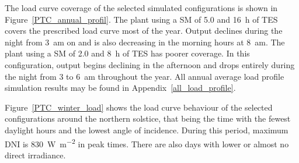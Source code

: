 The load curve coverage of the selected simulated configurations is shown in Figure~\ref{PTC_annual_profil}. The plant using a SM of \num{5.0} and \SI{16}{h} of TES covers the prescribed load curve most of the year. Output declines during the night from \SI{3}{am} on and is also decreasing in the morning hours at \SI{8}{am}. The plant using a SM of \num{2.0} and \SI{8}{h} of TES has poorer coverage. In this configuration, output begins declining in the afternoon and drops entirely during the night from \num{3} to \SI{6}{am} throughout the year. All annual average load profile simulation results may be found in Appendix~\ref{all_load_profile}.


Figure~\ref{PTC_winter_load} shows the load curve behaviour of the selected configurations around the northern solstice, that being the time with the fewest daylight hours and the lowest angle of incidence. During this period, maximum DNI is \SI{830}{\watt\per\square\metre} in peak times. There are also days with lower or almost no direct irradiance.

